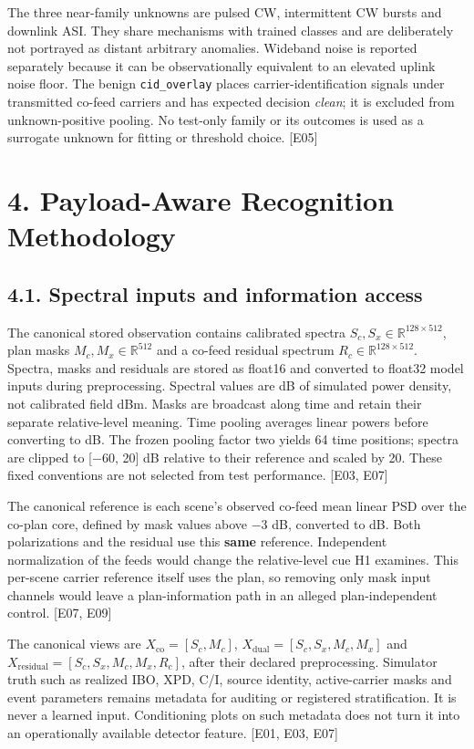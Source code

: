 \documentclass[
  10pt,
]{article}
\begin{document}
The three near-family unknowns are pulsed CW, intermittent CW bursts and
downlink ASI. They share mechanisms with trained classes and are
deliberately not portrayed as distant arbitrary anomalies. Wideband
noise is reported separately because it can be observationally
equivalent to an elevated uplink noise floor. The benign
\texttt{cid\_overlay} places carrier-identification signals under
transmitted co-feed carriers and has expected decision \emph{clean}; it
is excluded from unknown-positive pooling. No test-only family or its
outcomes is used as a surrogate unknown for fitting or threshold choice.
{[}E05{]}

\section{4. Payload-Aware Recognition
Methodology}\label{payload-aware-recognition-methodology}

\subsection{4.1. Spectral inputs and information
access}\label{spectral-inputs-and-information-access}

The canonical stored observation contains calibrated spectra
\(S_c,S_x\in\mathbb R^{128\times512}\), plan masks
\(M_c,M_x\in\mathbb R^{512}\) and a co-feed residual spectrum
\(R_c\in\mathbb R^{128\times512}\). Spectra, masks and residuals are
stored as float16 and converted to float32 model inputs during
preprocessing. Spectral values are dB of simulated power density, not
calibrated field dBm. Masks are broadcast along time and retain their
separate relative-level meaning. Time pooling averages linear powers
before converting to dB. The frozen pooling factor two yields 64 time
positions; spectra are clipped to {[}−60, 20{]} dB relative to their
reference and scaled by 20. These fixed conventions are not selected
from test performance. {[}E03, E07{]}

The canonical reference is each scene's observed co-feed mean linear PSD
over the co-plan core, defined by mask values above −3 dB, converted to
dB. Both polarizations and the residual use this \textbf{same}
reference. Independent normalization of the feeds would change the
relative-level cue H1 examines. This per-scene carrier reference itself
uses the plan, so removing only mask input channels would leave a
plan-information path in an alleged plan-independent control. {[}E07,
E09{]}

The canonical views are \(X_{\mathrm{co}}=[S_c,M_c]\),
\(X_{\mathrm{dual}}=[S_c,S_x,M_c,M_x]\) and
\(X_{\mathrm{residual}}=[S_c,S_x,M_c,M_x,R_c]\), after their declared
preprocessing. Simulator truth such as realized IBO, XPD, C/I, source
identity, active-carrier masks and event parameters remains metadata for
auditing or registered stratification. It is never a learned input.
Conditioning plots on such metadata does not turn it into an
operationally available detector feature. {[}E01, E03, E07{]}
\end{document}
